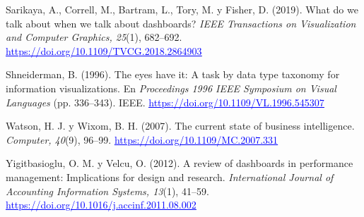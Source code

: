 \documentclass[12pt,a4paper]{article}
\newcommand{\enlace}[2]{\href{#1}{\textcolor{blue}{#2}}}
\begin{document}
\begin{thebibliography}{99}
Sarikaya, A., Correll, M., Bartram, L., Tory, M. y Fisher, D. (2019). What do we talk about when we talk
about dashboards? \emph{IEEE Transactions on Visualization and Computer Graphics, 25}(1), 682--692.
\enlace{https://doi.org/10.1109/TVCG.2018.2864903}{\uline{https:/}\allowbreak \uline{/}\allowbreak \uline{doi.}\allowbreak \uline{org/}\allowbreak \uline{10.}\allowbreak \uline{1109/}\allowbreak \uline{TVCG.}\allowbreak \uline{2018.}\allowbreak \uline{2864903}}

Shneiderman, B. (1996). The eyes have it: A task by data type taxonomy for information visualizations. En
\emph{Proceedings 1996 IEEE Symposium on Visual Languages} (pp. 336--343). IEEE.
\enlace{https://doi.org/10.1109/VL.1996.545307}{\uline{https:/}\allowbreak \uline{/}\allowbreak \uline{doi.}\allowbreak \uline{org/}\allowbreak \uline{10.}\allowbreak \uline{1109/}\allowbreak \uline{VL.}\allowbreak \uline{1996.}\allowbreak \uline{545307}}

Watson, H. J. y Wixom, B. H. (2007). The current state of business intelligence. \emph{Computer, 40}(9),
96--99. \enlace{https://doi.org/10.1109/MC.2007.331}{\uline{https:/}\allowbreak \uline{/}\allowbreak \uline{doi.}\allowbreak \uline{org/}\allowbreak \uline{10.}\allowbreak \uline{1109/}\allowbreak \uline{MC.}\allowbreak \uline{2007.}\allowbreak \uline{331}}

Yigitbasioglu, O. M. y Velcu, O. (2012). A review of dashboards in performance management: Implications
for design and research. \emph{International Journal of Accounting Information Systems, 13}(1), 41--59.
\enlace{https://doi.org/10.1016/j.accinf.2011.08.002}{\uline{https:/}\allowbreak \uline{/}\allowbreak \uline{doi.}\allowbreak \uline{org/}\allowbreak \uline{10.}\allowbreak \uline{1016/}\allowbreak \uline{j.}\allowbreak \uline{accinf.}\allowbreak \uline{2011.}\allowbreak \uline{08.}\allowbreak \uline{002}}

\end{thebibliography}
\end{document}
